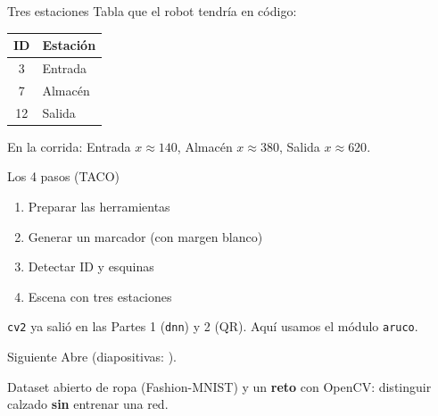 \documentclass[aspectratio=169]{beamer}
\begin{document}
\begin{frame}{Tres estaciones}
  Tabla que el robot tendría en código:

  \begin{tabular}{@{}cl@{}}
    \toprule
    ID & Estación \\
    \midrule
    3 & Entrada \\
    7 & Almacén \\
    12 & Salida \\
    \bottomrule
  \end{tabular}

  \vspace{1em}
  En la corrida: Entrada $x\approx140$, Almacén $x\approx380$, Salida $x\approx620$.
\end{frame}

\begin{frame}{Los 4 pasos (TACO)}
  \begin{enumerate}
    \item Preparar las herramientas
    \item Generar un marcador (con margen blanco)
    \item Detectar ID y esquinas
    \item Escena con tres estaciones
  \end{enumerate}

  \texttt{cv2} ya salió en las Partes 1 (\texttt{dnn}) y 2 (QR). Aquí usamos el módulo \texttt{aruco}.
\end{frame}

\begin{frame}{Siguiente}
  Abre  (diapositivas: ).

  Dataset abierto de ropa (Fashion-MNIST) y un \textbf{reto} con OpenCV: distinguir calzado \textbf{sin} entrenar una red.
\end{frame}
\end{document}
